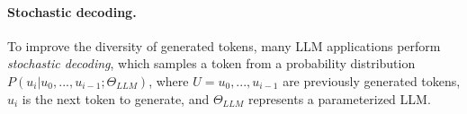 
\paragraph{Stochastic decoding.}
To improve the diversity of generated tokens, many LLM applications perform {\em stochastic decoding}, which samples a token from a probability distribution $P(u_i | u_0, ..., u_{i-1}; \Theta_{LLM})$, where $U = u_0,...,u_{i-1}$ are previously generated tokens, $u_i$ is the next token to generate, and $\Theta_{LLM}$ represents a parameterized LLM.

